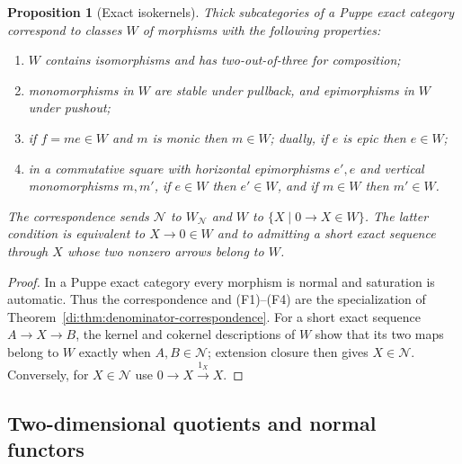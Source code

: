 \documentclass[11pt,reqno,a4paper]{amsart}
\newtheorem{proposition}[theorem]{Proposition}
\theoremstyle{definition}
\theoremstyle{remark}
\newcommand{\N}{\mathcal{N}}
\newcommand{\0}{\mathbf{0}}
\renewcommand{\1}{\mathbf{1}}
\begin{document}
\begin{proposition}[Exact isokernels]\label{prop:exact-isokernels}
Thick subcategories of a Puppe exact category correspond to classes
$W$ of morphisms with the following properties:
\begin{enumerate}[label=\textup{(F\arabic*)},leftmargin=16mm]
\item $W$ contains isomorphisms and has two-out-of-three for composition;
\item monomorphisms in $W$ are stable under pullback, and epimorphisms
in $W$ under pushout;
\item if $f=me\in W$ and $m$ is monic then $m\in W$; dually, if $e$
is epic then $e\in W$;
\item in a commutative square with horizontal epimorphisms $e',e$ and
vertical monomorphisms $m,m'$, if $e\in W$ then $e'\in W$, and if
$m\in W$ then $m'\in W$.
\end{enumerate}
The correspondence sends $\N$ to $W_{\N}$ and $W$ to
$\{X\mid 0\to X\in W\}$. The latter condition is equivalent to
$X\to0\in W$ and to admitting a short exact sequence through $X$
whose two nonzero arrows belong to $W$.
\end{proposition}
\begin{proof}
In a Puppe exact category every morphism is normal and
saturation is automatic. Thus the correspondence and
(F1)--(F4) are the specialization of
Theorem~\ref{di:thm:denominator-correspondence}.
For a short exact sequence $A\to X\to B$, the kernel and
cokernel descriptions of $W$ show that its two maps belong
to $W$ exactly when $A,B\in\N$; extension closure then
gives $X\in\N$. Conversely, for $X\in\N$ use
$0\to X\xrightarrow{1_X}X$.
\end{proof}

\subsection{Two-dimensional quotients and normal functors}
\end{document}
